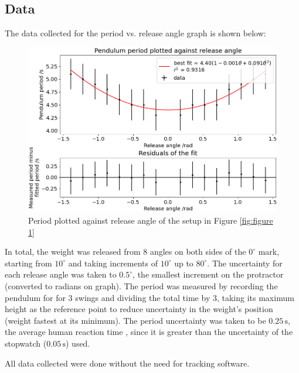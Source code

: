 \documentclass[11pt]{article}
\begin{document}
\begin{multicols}{2}
\subsection{Data} \label{sec 3.2 Data}
The data collected for the period vs. release angle graph is shown below:

\begin{figure}[H]
    \centering
    \includegraphics[width=\linewidth]{../figures/period_vs_release_angle.png}
    \caption{\centering Period plotted against release angle of the setup in Figure \ref{fig:figure 1}}
    \label{fig:figure 2}
\end{figure}

In total, the weight was released from 8 angles on both sides of the $0^{\circ}$ mark, starting from $10^\circ$ and taking increments of $10^\circ$ up to $80^\circ$. The uncertainty for each release angle was taken to $0.5^{\circ}$, the smallest increment on the protractor (converted to radians on graph). The period was measured by recording the pendulum for for 3 swings and dividing the total time by 3, taking its maximum height as the reference point to reduce uncertainty in the weight's position (weight fastest at its minimum). The period uncertainty was taken to be $0.25\,\text{s}$, the average human reaction time \cite{reaction-time}, since it is greater than the uncertainty of the stopwatch ($0.05\,\text{s}$) used.

All data collected were done without the need for tracking software.


\end{multicols}
\end{document}
